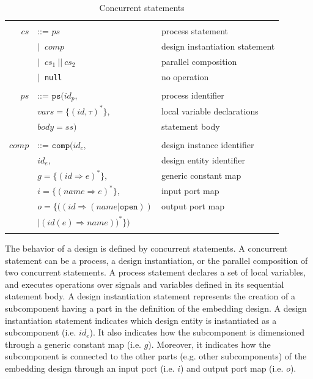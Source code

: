 \documentclass[pdflatex,sn-mathphys]{sn-jnl}%
\theoremstyle{thmstyleone}%
\theoremstyle{thmstyletwo}%
\theoremstyle{thmstylethree}%
\begin{document}
\begin{table}[!htbp]
  \caption{Concurrent statements}
  \label{tab:cs}
  \begin{tabular}{|rll|}
    \hline
    & & \\
    $cs$ & ::= $ps$ & process statement \\
    & $\vert{}~$ $comp$ & design instantiation statement \\
    & $\vert{}~$ $cs_1~\mathtt{||}~cs_2$ & parallel composition \\
    & $\vert{}~$ \texttt{null} & no operation \\
    & & \\
    $ps$ & ::= $\mathtt{ps}(id_p,$ & process identifier \\
    & \quad\quad\quad${}vars=\{(id,\tau)^{*}\},$ & local variable declarations\\
    & \quad\quad\quad${}body=ss)$ & statement body \\
    & & \\
    $comp$ & ::= $\mathtt{comp}(id_c,$ & design instance identifier \\
      & \quad\quad\quad\quad$id_e,$ & design entity identifier \\
      & \quad\quad\quad\quad${}g=\{(id\Rightarrow{}e)^{*}\},$ & generic constant map \\
      & \quad\quad\quad\quad${}i=\{(name\Rightarrow{}e)^{*}\},$ & input port map \\
    & \quad\quad\quad\quad$o=\{\big((id\Rightarrow{}(name\vert{}\mathtt{open}))$ & output port map \\
    & \quad\quad\quad\quad\quad\quad\quad$\big\vert{}(id(e)\Rightarrow{}name)\big)^{*}\})$ &  \\
    & & \\
    \hline
  \end{tabular}

\end{table}

The behavior of a design is defined by concurrent statements. A
concurrent statement can be a process, a design instantiation, or the
parallel composition of two concurrent statements. A process statement
declares a set of local variables, and executes operations over
signals and variables defined in its sequential statement body. A
design instantiation statement represents the creation of a
subcomponent having a part in the definition of the embedding
design. A design instantiation statement indicates which design entity
is instantiated as a subcomponent (i.e. $id_e$). It also indicates how
the subcomponent is dimensioned through a generic constant map
(i.e. $g$). Moreover, it indicates how the subcomponent is connected
to the other parts (e.g. other subcomponents) of the embedding design
through an input port (i.e. $i$) and output port map (i.e. $o$).
\end{document}
